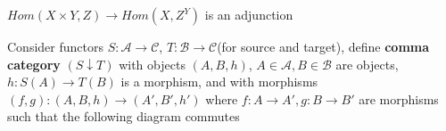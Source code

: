 \documentclass[main]{subfiles}
\begin{document}
\begin{proposition}
$Hom(X\times Y,Z)\to Hom(X,Z^Y)$ is an adjunction
\end{proposition}

\begin{definition}
Consider functors $S:\mathscr A\to\mathscr C$, $T:\mathscr B\to\mathscr C$(for source and target), define \textbf{comma category} $(S\downarrow T)$ with objects $(A,B,h)$, $A\in\mathscr A,B\in\mathscr B$ are objects, $h:S(A)\to T(B)$ is a morphism, and with morphisms $(f,g):(A,B,h)\to(A',B',h')$ where $f:A\to A',g:B\to B'$ are morphisms such that the following diagram commutes
\begin{center}
\end{center}
\end{definition}
\end{document}
